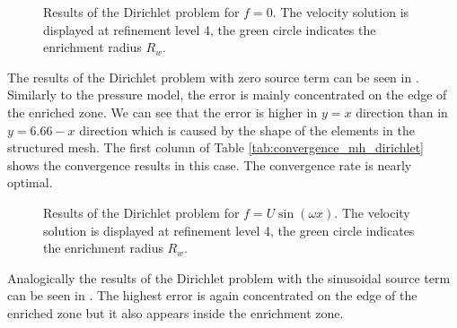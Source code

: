 %
\begin{figure}[!htb]
    \centering
    \caption
    {Results of the Dirichlet problem for $f=0$. The velocity solution is displayed at refinement level 4,
    the green circle indicates the enrichment radius $R_w$.}
    \label{fig:mh_dirichlet_zero_source}
\end{figure}
The results of the Dirichlet problem with zero source term can be seen in .
Similarly to the pressure model, the error is mainly concentrated on the edge of the enriched zone.
We can see that the error is higher in $y=x$ direction than in $y=6.66-x$ direction which is caused by the shape of the
elements in the structured mesh.
The first column of Table \ref{tab:convergence_mh_dirichlet} shows the convergence results in this case.
The convergence rate is nearly optimal.
\begin{figure}[!htb]
    \centering
    \caption
    {Results of the Dirichlet problem for $f=U\sin(\omega x)$. The velocity solution is displayed at refinement level 4,
    the green circle indicates the enrichment radius $R_w$.}
    \label{fig:mh_dirichlet_source}
\end{figure}
%
Analogically the results of the Dirichlet problem with the sinusoidal source term can be seen in .
The highest error is again concentrated on the edge of the enriched zone but it also appears
inside the enrichment zone. 


